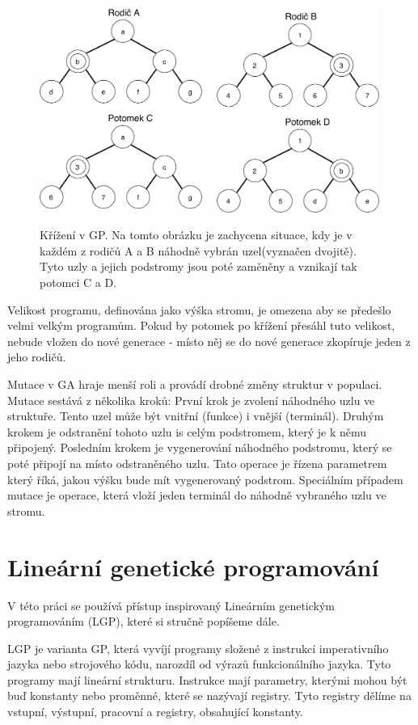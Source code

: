 \begin{figure}[h]
    \centering
    {\includegraphics[width=30em]{obrazky-figures/gp_krizeni.pdf}}
    \caption{
    Křížení v GP.
    Na tomto obrázku je zachycena situace, kdy je v každém z rodičů A a B náhodně vybrán uzel(vyznačen dvojitě).
    Tyto uzly a jejich podstromy jsou poté zaměněny a vznikají tak potomci C a D.
    }
    \label{fig:GP_krizeni}
\end{figure}

Velikost programu, definována jako výška stromu, je omezena aby se předešlo velmi velkým programům.
Pokud by potomek po křížení přesáhl tuto velikost, nebude vložen do nové generace - místo něj se do nové generace zkopíruje jeden z jeho rodičů.

Mutace v GA hraje menší roli a provádí drobné změny struktur v populaci.
Mutace sestává z několika kroků:
První krok je zvolení náhodného uzlu ve struktuře.
Tento uzel může být vnitřní (funkce) i vnější (terminál).
Druhým krokem je odstranění tohoto uzlu is celým podstromem, který je k němu připojený.
Posledním krokem je vygenerování náhodného podstromu, který se poté připojí na místo odstraněného uzlu.
Tato operace je řízena parametrem který říká, jakou výšku bude mít vygenerovaný podstrom.
Speciálním případem mutace je operace, která vloží jeden terminál do náhodně vybraného uzlu ve stromu.

\section{Lineární genetické programování}
V této práci se používá přístup inspirovaný Lineárním genetickým programováním (LGP), které si stručně popíšeme dále.

LGP je varianta GP, která vyvíjí programy složené z instrukcí imperativního jazyka nebo strojového kódu, narozdíl od výrazů funkcionálního jazyka.
Tyto programy mají lineární strukturu.
Instrukce mají parametry, kterými mohou být buď konstanty nebo proměnné, které se nazývají registry.
Tyto registry dělíme na vstupní, výstupní, pracovní a registry, obsahující konstanty.


